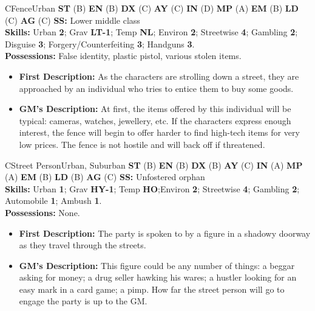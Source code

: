 \hrulefill

\begin{npc}{C}{Fence}{Urban}
  \textbf{ST} (B) \textbf{EN} (B) \textbf{DX} (C) \textbf{AY} (C) \textbf{IN} (D) \textbf{MP} (A) \textbf{EM} (B) \textbf{LD} (C) \textbf{AG} (C) \textbf{SS:} Lower middle class \\
  \textbf{Skills:} Urban \textbf{2}; Grav \textbf{LT-1}; Temp  \textbf{NL}; Environ \textbf{2}; Streetwise \textbf{4}; Gambling \textbf{2}; Disguise \textbf{3}; Forgery/Counterfeiting \textbf{3}; Handguns \textbf{3}. \\
  \textbf{Possessions:} False identity, plastic pistol, various stolen items. 
  \begin{itemize}
  \item \textbf{First Description:} As the characters are strolling down a street, they are approached by an individual who tries to entice them to buy 
    some goods. 
  \item \textbf{GM's Description:} At first, the items offered by this individual will be typical: cameras, watches, jewellery, etc. If the characters 
    express enough interest, the fence will begin to offer harder to find high-tech items for very low prices. The fence is not hostile and will 
    back off if threatened. 
  \end{itemize}
\end{npc}

\hrulefill

\begin{npc}{C}{Street Person}{Urban, Suburban}
\textbf{ST} (B) \textbf{EN} (B) \textbf{DX} (B) \textbf{AY} (C) \textbf{IN} (A) \textbf{MP} (A) \textbf{EM} (B) \textbf{LD} (B) \textbf{AG} (C) \textbf{SS:} Unfostered orphan \\
\textbf{Skills:} Urban \textbf{1}; Grav \textbf{HY-1}; Temp \textbf{HO};Environ \textbf{2}; Streetwise \textbf{4}; Gambling \textbf{2}; Automobile \textbf{1}; Ambush \textbf{1}. \\
\textbf{Possessions:} None. 
\begin{itemize}
\item \textbf{First Description:}  The party is spoken to by a figure in a shadowy doorway as they travel through the streets. 
\item \textbf{GM's Description:} This figure could be any number of things: a beggar asking for money; a drug seller hawking his wares; a hustler 
looking for an easy mark in a card game; a pimp. How far the street person will go to engage the party is up to the GM. 
\end{itemize}
\end{npc}

